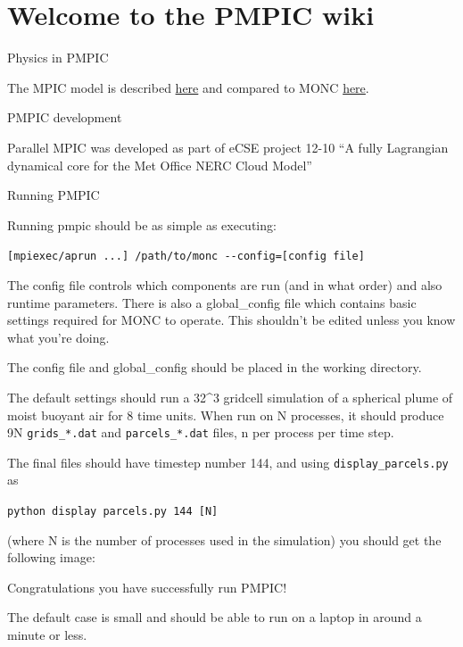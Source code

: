 \documentclass{beamer}
\begin{document}
\hypertarget{welcome-to-the-pmpic-wiki}{%
\section{Welcome to the PMPIC wiki}\label{welcome-to-the-pmpic-wiki}}

\begin{frame}{Physics in PMPIC}
\protect\hypertarget{physics-in-pmpic}{}

The MPIC model is described
\href{https://rmets.onlinelibrary.wiley.com/doi/10.1002/qj.3319}{here}
and compared to MONC
\href{https://rmets.onlinelibrary.wiley.com/doi/abs/10.1002/qj.3532}{here}.

\end{frame}

\begin{frame}{PMPIC development}
\protect\hypertarget{pmpic-development}{}

Parallel MPIC was developed as part of eCSE project 12-10 ``A fully
Lagrangian dynamical core for the Met Office NERC Cloud Model''

\end{frame}

\begin{frame}[fragile]{Running PMPIC}
\protect\hypertarget{running-pmpic}{}

Running pmpic should be as simple as executing:

\texttt{{[}mpiexec/aprun\ ...{]}\ /path/to/monc\ -\/-config={[}config\ file{]}}

The config file controls which components are run (and in what order)
and also runtime parameters. There is also a global\_config file which
contains basic settings required for MONC to operate. This shouldn't be
edited unless you know what you're doing.

The config file and global\_config should be placed in the working
directory.

The default settings should run a 32\^{}3 gridcell simulation of a
spherical plume of moist buoyant air for 8 time units. When run on N
processes, it should produce 9N \texttt{grids\_*.dat} and
\texttt{parcels\_*.dat} files, n per process per time step.

The final files should have timestep number 144, and using
\texttt{display\_parcels.py} as

\texttt{python\ display\ parcels.py\ 144\ {[}N{]}}

(where N is the number of processes used in the simulation) you should
get the following image:


Congratulations you have successfully run PMPIC!

The default case is small and should be able to run on a laptop in
around a minute or less.

\end{frame}
\end{document}
